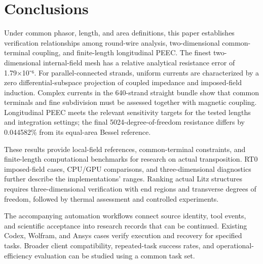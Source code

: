 \section{Conclusions}
\label{chapter:12}

\hypertarget{12.conclusions.p1}{}
Under common phasor, length, and area definitions, this paper establishes verification relationships among round-wire analysis, two-dimensional common-terminal coupling, and finite-length longitudinal PEEC. The finest two-dimensional internal-field mesh has a relative analytical resistance error of 1.79×10⁻⁶. For parallel-connected strands, uniform currents are characterized by a zero differential-subspace projection of coupled impedance and imposed-field induction. Complex currents in the 640-strand straight bundle show that common terminals and fine subdivision must be assessed together with magnetic coupling. Longitudinal PEEC meets the relevant sensitivity targets for the tested lengths and integration settings; the final 5024-degree-of-freedom resistance differs by 0.044582\% from its equal-area Bessel reference.

\hypertarget{12.conclusions.p2}{}
These results provide local-field references, common-terminal constraints, and finite-length computational benchmarks for research on actual transposition. RT0 imposed-field cases, CPU/GPU comparisons, and three-dimensional diagnostics further describe the implementations' ranges. Ranking actual Litz structures requires three-dimensional verification with end regions and transverse degrees of freedom, followed by thermal assessment and controlled experiments.

\hypertarget{12.automation.conclusion}{}
The accompanying automation workflows connect source identity, tool events, and scientific acceptance into research records that can be continued. Existing Codex, Wolfram, and Ansys cases verify execution and recovery for specified tasks. Broader client compatibility, repeated-task success rates, and operational-efficiency evaluation can be studied using a common task set.
